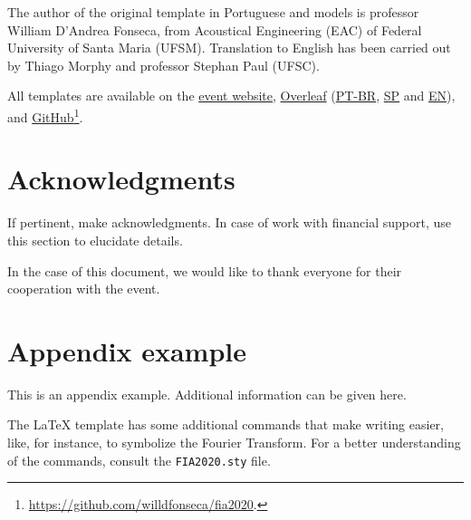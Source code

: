 \documentclass[12pt, a4paper, twoside, twocolumn]{article}
\begin{document}
\clearpage
The author of the original template in Portuguese and models is professor William D'Andrea Fonseca, from Acoustical Engineering (EAC) of Federal University of Santa Maria (UFSM). Translation to English has been carried out by Thiago Morphy and professor Stephan Paul (UFSC). 

All templates are available on the \href{http://www.fia2022.com.br}{event website}, \href{https://www.overleaf.com/read/hgryywpgmxdx}{Overleaf} (\href{https://www.overleaf.com/read/rnfjxkknksnd}{PT-BR}, \href{https://www.overleaf.com/read/rszcxtwshzfr}{SP} and \href{https://www.overleaf.com/read/hgryywpgmxdx}{EN}),  and \href{https://github.com/willdfonseca/fia2020}{GitHub}\footnote{\url{https://github.com/willdfonseca/fia2020}.}.

\section{Acknowledgments}

If pertinent, make acknowledgments. In case of work with financial support, use this section to elucidate details.

In the case of this document, we would like to thank everyone for their cooperation with the event.

\renewcommand{\refname}{References} 
 
\fontrefs 

\appendix
\section{Appendix example}

This is an appendix example. Additional information can be given here.

The \LaTeX\xspace template has some additional commands that make writing easier, like, for instance, \F\xspace to symbolize the Fourier Transform. For a better understanding of the commands, consult the \texttt{FIA2020.sty} file.
\end{document}

